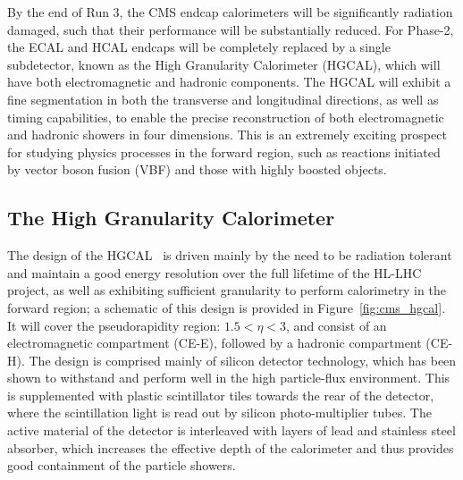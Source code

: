 By the end of Run 3, the CMS endcap calorimeters will be significantly radiation damaged, such that their performance will be substantially reduced. For Phase-2, the ECAL and HCAL endcaps will be completely replaced by a single subdetector, known as the High Granularity Calorimeter (HGCAL), which will have both electromagnetic and hadronic components. The HGCAL will exhibit a fine segmentation in both the transverse and longitudinal directions, as well as timing capabilities, to enable the precise reconstruction of both electromagnetic and hadronic showers in four dimensions. This is an extremely exciting prospect for studying physics processes in the forward region, such as reactions initiated by vector boson fusion (VBF) and those with highly boosted objects.

\subsection{The High Granularity Calorimeter}\label{sec:hgcal}
The design of the HGCAL~\cite{} is driven mainly by the need to be radiation tolerant and maintain a good energy resolution over the full lifetime of the HL-LHC project, as well as exhibiting sufficient granularity to perform calorimetry in the forward region; a schematic of this design is provided in Figure~\ref{fig:cms_hgcal}. It will cover the pseudorapidity region: $1.5<\eta<3$, and  consist of an electromagnetic compartment (CE-E), followed by a hadronic compartment (CE-H). The design is comprised mainly of silicon detector technology, which has been shown to withstand and perform well in the high particle-flux environment. This is supplemented with plastic scintillator tiles towards the rear of the detector, where the scintillation light is read out by silicon photo-multiplier tubes. The active material of the detector is interleaved with layers of lead and stainless steel absorber, which increases the effective depth of the calorimeter and thus provides good containment of the particle showers.

